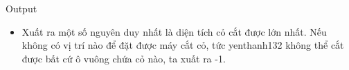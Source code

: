 Output  
\begin{itemize}
	\item     Xuất ra một số nguyên duy nhất là diện tích cỏ cắt được lớn nhất. Nếu không có vị trí nào để đặt được máy cắt cỏ, tức    yenthanh132    không thể cắt được bất cứ ô vuông chứa cỏ nào, ta xuất ra -1.   
\end{itemize}
